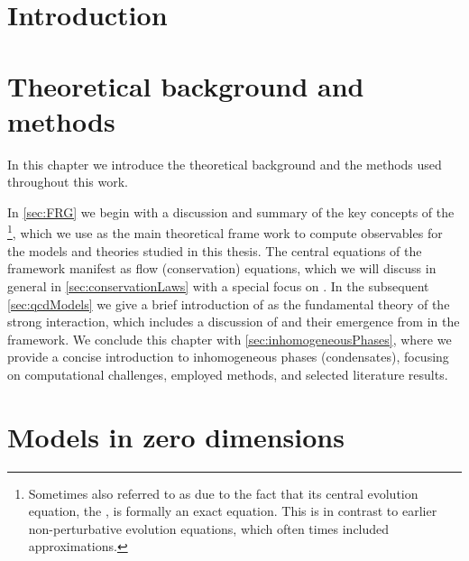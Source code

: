 \mainmatter

\chapter{Introduction}\label{chap:introduction}


\chapter{Theoretical background and methods}\label{chap:methods}
In this chapter we introduce the theoretical background and the methods used throughout this work.

In \cref{sec:FRG} we begin with a discussion and summary of the key concepts of the \frg{}\footnote{%
	Sometimes also referred to as \erg{} due to the fact that its central \rg{} evolution equation, \viz{} the \frgEq{}, is formally an exact equation.
	This is in contrast to earlier non-perturbative \rg{} evolution equations, which often times included approximations.%
}, which we use as the main theoretical frame work to compute observables for the models and theories studied in this thesis.
The central equations of the \frg{} framework manifest as flow (conservation) equations, which we will discuss in general in \cref{sec:conservationLaws} with a special focus on \cfd{}.
In the subsequent \cref{sec:qcdModels} we give a brief introduction of \qcd{} as the fundamental theory of the strong interaction, which includes a discussion of \loefts{} and their emergence from \qcd{} in the \frg{} framework.
We conclude this chapter with \cref{sec:inhomogeneousPhases}, where we provide a concise introduction to inhomogeneous phases (condensates), focusing on computational challenges, employed methods, and selected literature results.






\chapter{Models in zero dimensions}\label{chap:zeroONSU2}






